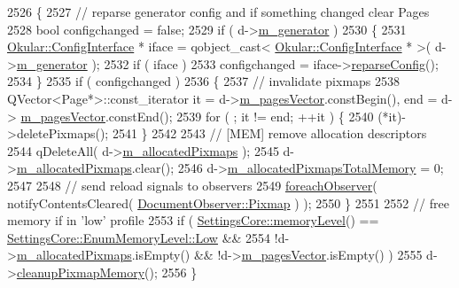 \begin{DoxyCode}
2526 \{
2527     \textcolor{comment}{// reparse generator config and if something changed clear Pages}
2528     \textcolor{keywordtype}{bool} configchanged = \textcolor{keyword}{false};
2529     \textcolor{keywordflow}{if} ( d->\hyperlink{classOkular_1_1DocumentPrivate_a52083f79ce95756ddea060e74315e91f}{m\_generator} )
2530     \{
2531         \hyperlink{classOkular_1_1ConfigInterface}{Okular::ConfigInterface} * iface = qobject\_cast< 
      \hyperlink{classOkular_1_1ConfigInterface}{Okular::ConfigInterface} * >( d->\hyperlink{classOkular_1_1DocumentPrivate_a52083f79ce95756ddea060e74315e91f}{m\_generator} );
2532         \textcolor{keywordflow}{if} ( iface )
2533             configchanged = iface->\hyperlink{classOkular_1_1ConfigInterface_a0f61ec6852e483b898efd9709b1ef63b}{reparseConfig}();
2534     \}
2535     \textcolor{keywordflow}{if} ( configchanged )
2536     \{
2537         \textcolor{comment}{// invalidate pixmaps}
2538         QVector<Page*>::const\_iterator it = d->\hyperlink{classOkular_1_1DocumentPrivate_a73b852d9a73ffe8061b66dbf9b290f17}{m\_pagesVector}.constBegin(), end = d->
      \hyperlink{classOkular_1_1DocumentPrivate_a73b852d9a73ffe8061b66dbf9b290f17}{m\_pagesVector}.constEnd();
2539         \textcolor{keywordflow}{for} ( ; it != end; ++it ) \{
2540             (*it)->deletePixmaps();
2541         \}
2542 
2543         \textcolor{comment}{// [MEM] remove allocation descriptors}
2544         qDeleteAll( d->\hyperlink{classOkular_1_1DocumentPrivate_a13e55dcfc91cfbe1ff91a55312f3e39f}{m\_allocatedPixmaps} );
2545         d->\hyperlink{classOkular_1_1DocumentPrivate_a13e55dcfc91cfbe1ff91a55312f3e39f}{m\_allocatedPixmaps}.clear();
2546         d->\hyperlink{classOkular_1_1DocumentPrivate_accbd72ead7fca72852b516f580d2abf1}{m\_allocatedPixmapsTotalMemory} = 0;
2547 
2548         \textcolor{comment}{// send reload signals to observers}
2549         \hyperlink{core_2document_8cpp_a67e536532b9ae1f36450a4ebff082fea}{foreachObserver}( notifyContentsCleared( 
      \hyperlink{classOkular_1_1DocumentObserver_af0e6b09d5fc7ecb673bd4895ef2710dca3263576701c6ec7dc0a8e8945054db56}{DocumentObserver::Pixmap} ) );
2550     \}
2551 
2552     \textcolor{comment}{// free memory if in 'low' profile}
2553     \textcolor{keywordflow}{if} ( \hyperlink{classOkular_1_1SettingsCore_a07d75a8b7db6da9213663287a87e3226}{SettingsCore::memoryLevel}() == 
      \hyperlink{classOkular_1_1SettingsCore_1_1EnumMemoryLevel_a6dcad4c36c335a5cab78f24dd88090b4aa61e4f07eed0bf070a41fb0998e8c3b5}{SettingsCore::EnumMemoryLevel::Low} &&
2554          !d->\hyperlink{classOkular_1_1DocumentPrivate_a13e55dcfc91cfbe1ff91a55312f3e39f}{m\_allocatedPixmaps}.isEmpty() && !d->\hyperlink{classOkular_1_1DocumentPrivate_a73b852d9a73ffe8061b66dbf9b290f17}{m\_pagesVector}.isEmpty() )
2555         d->\hyperlink{classOkular_1_1DocumentPrivate_a8490b106f8f873de76b7ca6dcb1320f0}{cleanupPixmapMemory}();
2556 \}
\end{DoxyCode}
